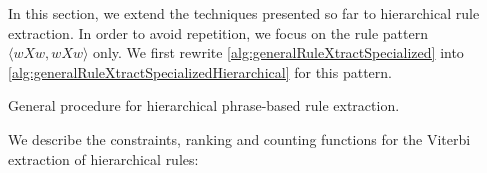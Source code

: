 In this section, we extend the techniques presented so far to hierarchical
rule extraction. In order to avoid repetition, we focus on the rule pattern
$\langle w X w, w X w \rangle$ only. We first rewrite
\autoref{alg:generalRuleXtractSpecialized} into
\autoref{alg:generalRuleXtractSpecializedHierarchical} for this pattern.
%
\begin{algorithm}
  \caption{General procedure for hierarchical phrase-based rule extraction.}
  \label{alg:generalRuleXtractSpecializedHierarchical}
  \begin{algorithmic}[1]
         
        \EndIf
         
           
          \EndIf
        \EndFor
         
           
          \EndIf
        \EndFor
      \EndFor
    \EndFunction
  \end{algorithmic}
\end{algorithm}
%
We describe the constraints, ranking and counting functions for the Viterbi
extraction of hierarchical rules:
%

